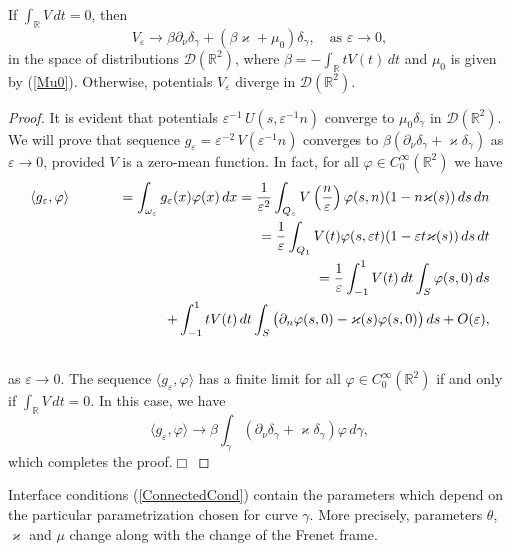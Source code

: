 \documentclass[graybox]{svmult}
\renewcommand{\kappa}{\varkappa}
\newcommand{\Real}{\mathbb R}
\newcommand{\eps}{\varepsilon}
\renewcommand{\phi}{\varphi}
\newcommand{\eqref}[1]{(\ref{#1})}
\begin{document}
\begin{proposition}\label{PropVepsConverg}
If $\int_\Real V\,dt=0$, then
$$
   V_\eps\to \beta\partial_\nu\delta_\gamma+\left(\beta\kappa+\mu_0\right) \delta_\gamma,\quad \mbox{as } \eps\to 0,
$$
in the space of distributions $\mathcal{D}(\Real^2)$, where
$\beta=-\int_\Real t V(t)\,dt$ and $\mu_0$ is given by \eqref{Mu0}.
Otherwise, potentials $V_\eps$ diverge in $\mathcal{D}(\Real^2)$.

\end{proposition}
\begin{proof}
It is evident that potentials $\eps^{-1}\,U\left(s,\eps^{-1}n\right)$
converge to $\mu_0 \delta_\gamma$ in $\mathcal{D}(\Real^2)$.
We will prove that sequence $g_\eps=\eps^{-2}\,V\left(\eps^{-1}n\right)$ converges to
$\beta\left(\partial_\nu\delta_\gamma+\kappa\delta_\gamma\right)$ as $\eps\to 0$, provided $V$ is a zero-mean function.
  In fact, for all $\phi\in C^\infty_0(\Real^2)$ we have
\begin{eqnarray}\nonumber
\langle g_\eps, \phi \rangle&&=\int_{\omega_\eps}g_\eps(x)\phi(x)\,dx
=
\frac{1}{\eps^2}\int_{Q_\eps} V\left(\frac{n}{\eps}\right)\phi(s,n)(1-n\kappa(s))\,ds\,dn
\\\nonumber
&& =
\frac{1}{\eps}\int_{Q_1} V(t)\phi(s,\eps t)(1-\eps t\kappa(s))\,ds\,dt
\\\nonumber
&&=\frac{1}{\eps}\int_{-1}^1 V(t)\,dt \int_S\phi(s,0)\,ds
\\\nonumber
&& \kern60pt
+
\int_{-1}^1 t V(t)\,dt \int_S\big(\partial_n\phi(s,0)-\kappa(s)\phi(s,0)\big)\,ds+O(\eps),
\\\nonumber
\end{eqnarray}
as $\eps\to 0$.
The sequence $\langle g_\eps, \phi \rangle$ has a finite limit for all $\phi\in C^\infty_0(\Real^2)$ if and only if $\int_\Real V\,dt=0$.
In this case, we have
$$
\langle g_\eps, \phi \rangle\to \beta\int_\gamma\left(\partial_\nu\delta_\gamma+\kappa \delta_\gamma\right)\phi\,d\gamma,
$$
which completes the proof.\hfill$\Box$
\end{proof}

Interface conditions \eqref{ConnectedCond} contain the parameters which depend on the particular parametrization chosen for curve $\gamma$. More precisely, parameters $\theta$, $\kappa$ and $\mu$ change along with the change of the Frenet frame.
\end{document}
